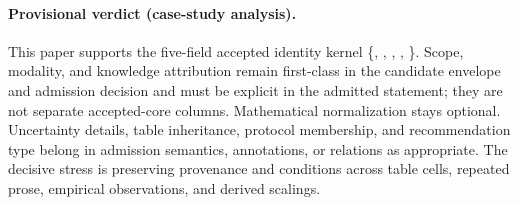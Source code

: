 \paragraph{Provisional verdict (case-study analysis).}
This paper supports the five-field accepted identity kernel \{, , , , \}. Scope, modality, and knowledge attribution remain first-class in the candidate envelope and admission decision and must be explicit in the admitted statement; they are not separate accepted-core columns. Mathematical normalization stays optional. Uncertainty details, table inheritance, protocol membership, and recommendation type belong in admission semantics, annotations, or relations as appropriate. The decisive stress is preserving provenance and conditions across table cells, repeated prose, empirical observations, and derived scalings.